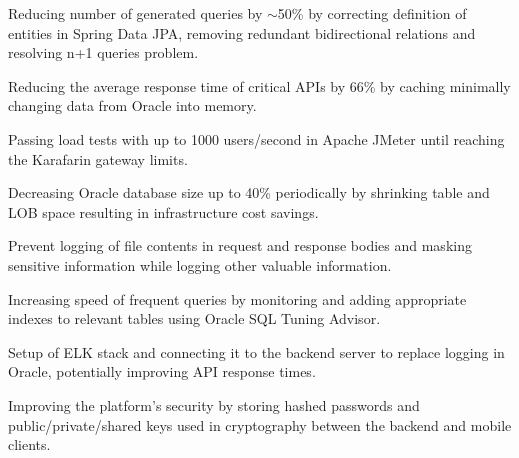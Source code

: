 \begin{cventries}
{\begin{cvprojects}
{\begin{projectitems}
			\item {Reducing number of generated queries by $\sim$50\% by correcting definition of entities in Spring Data JPA, removing redundant bidirectional relations and resolving n+1 queries problem.}
			\item {Reducing the average response time of critical APIs by 66\% by caching minimally changing data from Oracle into memory.}
			\item {Passing load tests with up to 1000 users/second in Apache JMeter until reaching the Karafarin gateway limits.}
			\item {Decreasing Oracle database size up to 40\% periodically by shrinking table and LOB space resulting in infrastructure cost savings.}
			\item {Prevent logging of file contents in request and response bodies and masking sensitive information while logging other valuable information.}
			\item {Increasing speed of frequent queries by monitoring and adding appropriate indexes to relevant tables using Oracle SQL Tuning Advisor.}
			\item {Setup of ELK stack and connecting it to the backend server to replace logging in Oracle, potentially improving API response times.}
			\item {Improving the platform's security by storing hashed passwords and public/private/shared keys used in cryptography between the backend and mobile clients.}
          \end{projectitems}
        }
      \end{cvprojects}
    }


\end{cventries}
